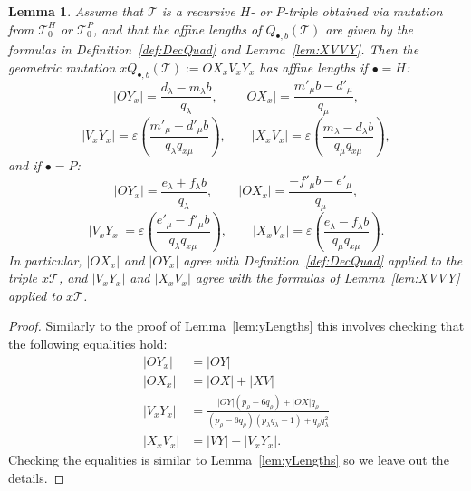 \documentclass[11pt, reqno]{amsart}
\newtheorem{lemma}[thm]{Lemma}
\theoremstyle{remark}
\numberwithin{equation}{subsection}
\numberwithin{figure}{section}
\theoremstyle{customremark}
\newcommand{\la}{{\lambda}}
\begin{document}
\begin{lemma}\label{lem:xLengths}
Assume that $\mathcal{T}$ is a recursive $H$- or $P$-triple obtained via mutation from $\mathcal{T}_0^H$ or $\mathcal{T}_0^P$, and that the affine lengths of $Q_{\bullet,b}(\mathcal{T})$ are given by the formulas in Definition~\ref{def:DecQuad} and Lemma~\ref{lem:XVVY}. Then the geometric mutation $xQ_{\bullet,b}(\mathcal{T}) := OX_xV_xY_x$ has affine lengths if $\bullet=H$:
\[
|OY_x| = \frac{d_\lambda - m_\lambda b}{q_\lambda}, \qquad |OX_x| = \frac{m'_\mu b - d'_\mu}{q_\mu},
\]
\[
|V_xY_x| = \varepsilon\left(\frac{m'_\mu - d'_\mu b}{q_\lambda q_{x\mu}}\right), \qquad |X_xV_x| = \varepsilon\left(\frac{m_\lambda - d_\lambda b}{q_\mu q_{x\mu}}\right),
\]
and if $\bullet=P$:
\[
|OY_x| = \frac{e_\lambda + f_\lambda b}{q_\lambda}, \qquad |OX_x| = \frac{-f'_\mu b - e'_\mu}{q_\mu},
\]
\[
|V_xY_x| = \varepsilon\left(\frac{e'_\mu - f'_\mu b}{q_\lambda q_{x\mu}}\right), \qquad |X_xV_x| = \varepsilon\left(\frac{e_\lambda - f_\lambda b}{q_\mu q_{x\mu}}\right).
\]
In particular, $|OX_x|$ and $|OY_x|$ agree with Definition~\ref{def:DecQuad} applied to the triple $x\mathcal{T}$, and $|V_xY_x|$ and $|X_xV_x|$ agree with the formulas of Lemma~\ref{lem:XVVY} applied to $x\mathcal{T}$. 

\end{lemma}
\begin{proof}
    Similarly to the proof of Lemma~\ref{lem:yLengths} this involves checking that the following equalities hold: 
    \begin{align*} 
    |OY_x|&=|OY| \\
    |OX_x|&=|OX|+|XV| \\ 
    |V_xY_x|&=\frac{|OY|(p_\rho-6q_\rho)+|OX|q_\rho}{(p_\rho-6q_\rho)(p_\la q_\la-1)+q_\rho q_\la^2} \\ 
    |X_xV_x|&=|VY|-|V_xY_x|. 
\end{align*}
Checking the equalities is similar to Lemma~\ref{lem:yLengths} so we leave out the details. 
\end{proof}
\end{document}
